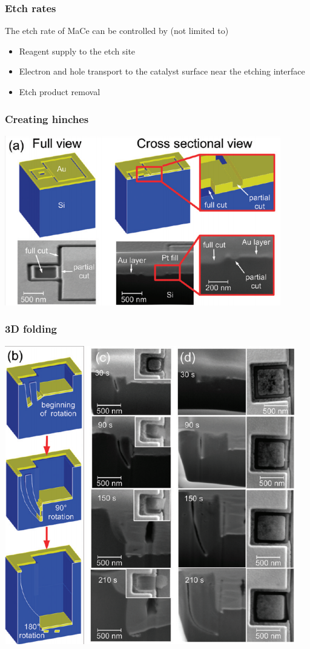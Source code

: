 \documentclass{beamer}
\begin{document}
\begin{frame}\frametitle{Etch rates}
    The etch rate of MaCe can be controlled by (not limited to)
    \begin{itemize}
        \item Reagent supply to the etch site
        \item Electron and hole transport to the
catalyst surface near the etching interface
        \item Etch product removal
    \end{itemize}
\end{frame}

\begin{frame}\frametitle{Creating hinches}
    \centering
    \begin{minipage}{0.7\textwidth}
		\includegraphics[width=\textwidth]{images/fig5.png}
	\end{minipage}
\end{frame}
\begin{frame}\frametitle{3D folding}
    \centering
    \begin{minipage}{0.7\textwidth}
		\includegraphics[width=\textwidth]{images/fig6.png}
	\end{minipage}
\end{frame}
\end{document}
